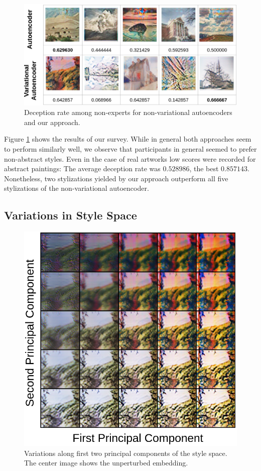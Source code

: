 \documentclass[10pt,twocolumn,letterpaper]{article}
\begin{document}
\begin{figure}
\centering
\includegraphics[width=0.9\linewidth]{survey.png}
\caption{Deception rate among non-experts for non-variational autoencoders and our approach.}
\label{fig:survey}
\end{figure}

Figure \ref{fig:survey} shows the results of our survey. While in general both approaches seem to perform similarly well, we observe that participants in general seemed to prefer non-abstract styles. Even in the case of real artworks low scores were recorded for abstract paintings: The average deception rate was $0.528986$, the best $0.857143$. Nonetheless, two stylizations yielded by our approach outperform all five stylizations of the non-variational autoencoder.


\subsection{Variations in Style Space}

\begin{figure}
\centering
\includegraphics[width=0.8\linewidth]{pca.png}
\caption{Variations along first two principal components of the style space. The center image shows the unperturbed embedding.}
\label{fig:pca}
\end{figure}
\end{document}
